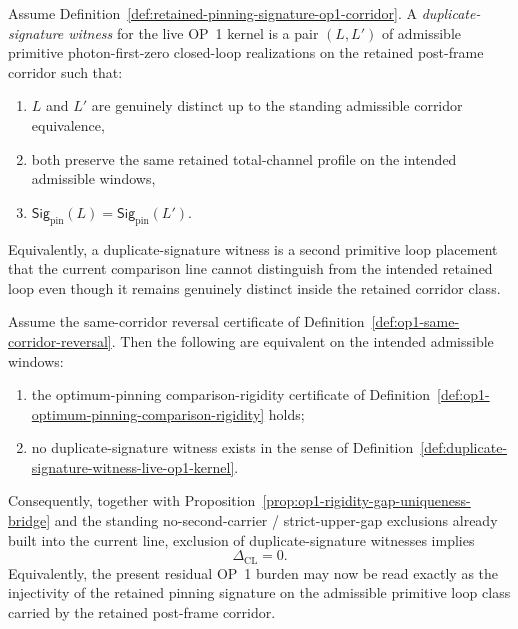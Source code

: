\begin{definition}
\label{def:duplicate-signature-witness-live-op1-kernel}
Assume Definition~\ref{def:retained-pinning-signature-op1-corridor}. A \emph{duplicate-signature witness} for the live OP~1 kernel is a pair $(L,L')$ of admissible primitive photon-first-zero closed-loop realizations on the retained post-frame corridor such that:
\begin{enumerate}[label=(\roman*)]
 \item $L$ and $L'$ are genuinely distinct up to the standing admissible corridor equivalence,
 \item both preserve the same retained total-channel profile on the intended admissible windows,
 \item \(\mathsf{Sig}_{\mathrm{pin}}(L)=\mathsf{Sig}_{\mathrm{pin}}(L')\).
\end{enumerate}
Equivalently, a duplicate-signature witness is a second primitive loop placement that the current comparison line cannot distinguish from the intended retained loop even though it remains genuinely distinct inside the retained corridor class.
\end{definition}

\begin{proposition}
\label{prop:live-op1-burden-equivalent-exclusion-duplicate-signature-witnesses}
Assume the same-corridor reversal certificate of Definition~\ref{def:op1-same-corridor-reversal}. Then the following are equivalent on the intended admissible windows:
\begin{enumerate}[label=(\roman*)]
 \item the optimum-pinning comparison-rigidity certificate of Definition~\ref{def:op1-optimum-pinning-comparison-rigidity} holds;
 \item no duplicate-signature witness exists in the sense of Definition~\ref{def:duplicate-signature-witness-live-op1-kernel}.
\end{enumerate}
Consequently, together with Proposition~\ref{prop:op1-rigidity-gap-uniqueness-bridge} and the standing no-second-carrier / strict-upper-gap exclusions already built into the current line, exclusion of duplicate-signature witnesses implies
\[
\Delta_{\mathrm{CL}}=0.
\]
Equivalently, the present residual OP~1 burden may now be read exactly as the injectivity of the retained pinning signature on the admissible primitive loop class carried by the retained post-frame corridor.
\end{proposition}

